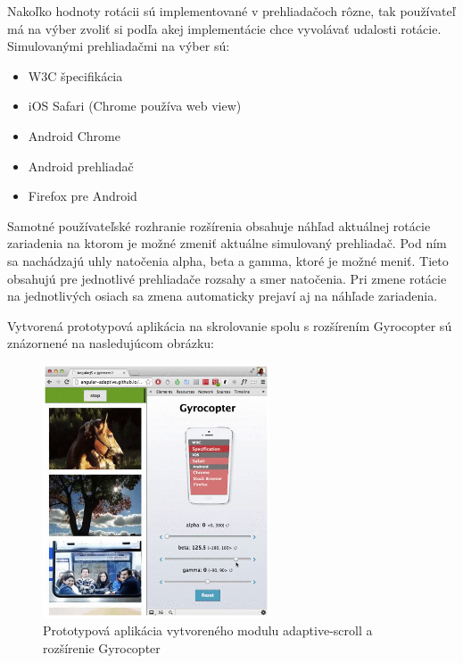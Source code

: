 Nakoľko hodnoty rotácii sú implementované v prehliadačoch rôzne, tak používateľ má na výber zvoliť si podľa akej implementácie chce vyvolávať udalosti rotácie. Simulovanými prehliadačmi na výber sú:

\begin{itemize}
  \item W3C špecifikácia
  \item iOS Safari (Chrome používa web view)
  \item Android Chrome
  \item Android prehliadač
  \item Firefox pre Android
\end{itemize}

Samotné používateľské rozhranie rozšírenia obsahuje náhľad aktuálnej rotácie zariadenia na ktorom je možné zmeniť aktuálne simulovaný prehliadač. Pod ním sa nachádzajú uhly natočenia alpha, beta a gamma, ktoré je možné meniť. Tieto obsahujú pre jednotlivé prehliadače rozsahy a smer natočenia. Pri zmene rotácie na jednotlivých osiach sa zmena automaticky prejaví aj na náhľade zariadenia. 

\newpage
Vytvorená prototypová aplikácia na skrolovanie spolu s rozšírením Gyrocopter sú znázornené na nasledujúcom obrázku:

\begin{figure}[H]
  \centering
  \includegraphics[width=0.6\textwidth]{img/adaptivescroll.png}
  \caption[Prototypová aplikácia vytvoreného modulu adaptive-scroll a rozšírenie Gyrocopter]{
    Prototypová aplikácia vytvoreného modulu adaptive-scroll a rozšírenie Gyrocopter}
  \label{fig: adaptivescroll}
\end{figure}


